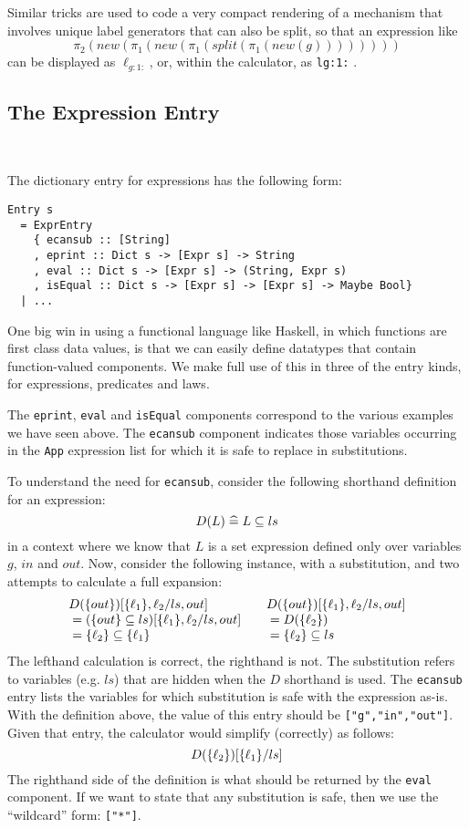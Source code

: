 Similar tricks are used to code a very compact rendering
of a mechanism that involves unique label generators
that can also be split, so that an expression like
\[
 \pi_2(new(\pi_1(new(\pi_1(split(\pi_1(new(g))))))))
\]
can be displayed as $\ell_{g:1:}$, or,
within the calculator, as \texttt{lg:1:} .


\subsection{The Expression Entry}~

The dictionary entry for expressions has the following form:
\begin{verbatim}
Entry s
  = ExprEntry
    { ecansub :: [String]
    , eprint :: Dict s -> [Expr s] -> String
    , eval :: Dict s -> [Expr s] -> (String, Expr s)
    , isEqual :: Dict s -> [Expr s] -> [Expr s] -> Maybe Bool}
  | ...
\end{verbatim}
One big win in using a functional language like Haskell,
in which functions are first class data values,
is that we can easily define datatypes that
contain function-valued components.
We make full use of this in three of the entry kinds,
for expressions, predicates and laws.

The \texttt{eprint}, \texttt{eval} and \texttt{isEqual} components correspond
to the various examples we have seen above.
The \texttt{ecansub} component
indicates those variables occurring in the \texttt{App} expression
list for which it is safe to replace in substitutions.

To understand the need for \texttt{ecansub},
consider the following shorthand definition for an expression:
\[
  D(L) \mathrel{\widehat=} L \subseteq ls
\]
in a context where we know that $L$ is a set expression defined
only over variables $g$, $in$ and $out$.
Now, consider the following instance, with a substitution,
and two attempts to calculate a full expansion:
\[\begin{array}{l@{\qquad}l}
   D(\setof{out})[\setof{\ell_1},\ell_2/ls,out]
 & D(\setof{out})[\setof{\ell_1},\ell_2/ls,out]
\\ {} = (\setof{out} \subseteq ls)[\setof{\ell_1},\ell_2/ls,out]
 & {}= D(\setof{\ell_2})
\\ {} = \setof{\ell_2} \subseteq \setof{\ell_1}
 & {} = \setof{\ell_2} \subseteq ls
\end{array}\]
The lefthand calculation is correct, the righthand is not.
The substitution refers to variables (e.g. $ls$)
that are hidden when the $D$ shorthand is used.
The \texttt{ecansub} entry lists the variables for which substitution
is safe with the expression as-is.
With the definition above, the value of this entry
 should be \texttt{["g","in","out"]}.
Given that entry, the calculator would simplify (correctly) as follows:
\[
  D(\{{\ell_2}\})[\{{\ell_1}\}/ls]
\]
The righthand side of the definition is what should be returned
by the \texttt{eval} component.
If we want to state that any substitution is safe,
then we use the ``wildcard'' form: \texttt{["*"]}.

